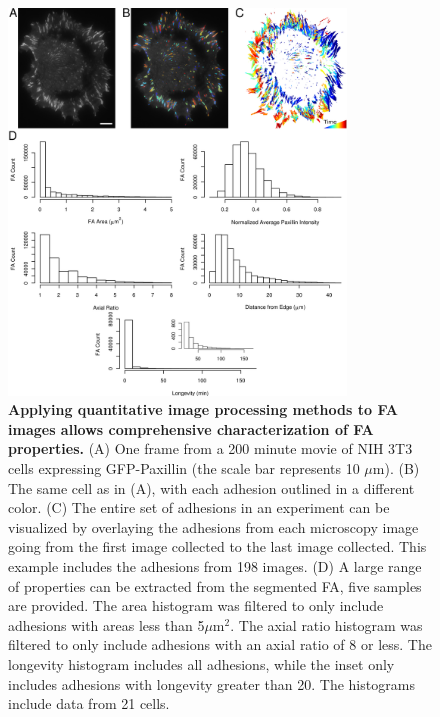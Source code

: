 \begin{figure}[htbp]
\begin{center}
\includegraphics[width=0.8\textwidth]{../figures/statics/statics}
\end{center}
\caption{
{\bf Applying quantitative image processing methods to FA images allows
comprehensive characterization of FA properties.} (A) One frame from a 200
minute movie of NIH 3T3 cells expressing GFP-Paxillin (the scale bar represents
10 $\mu$m). (B) The same cell as in (A), with each adhesion outlined in a
different color. (C) The entire set of adhesions in an experiment can be
visualized by overlaying the adhesions from each microscopy image going from the
first image collected to the last image collected. This example includes the
adhesions from 198 images. (D) A large range of properties can be extracted from
the segmented FA, five samples are provided.  The area histogram was filtered to
only include adhesions with areas less than 5$\mu$m$^2$. The axial ratio
histogram was filtered to only include adhesions with an axial ratio of 8 or
less. The longevity histogram includes all adhesions, while the inset only
includes adhesions with longevity greater than 20. The histograms include data
from 21 cells.
}
\label{statics}
\end{figure}


